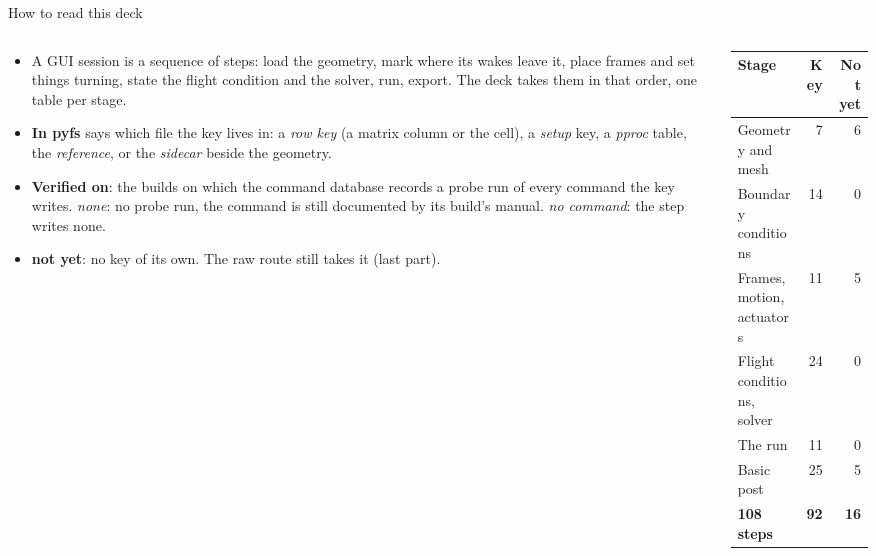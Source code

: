 %

\begin{frame}{How to read this deck}
\begin{columns}[T]
\begin{column}{0.56\textwidth}
\begin{itemize}\footnotesize
  \item A GUI session is a sequence of steps: load the geometry, mark where its
        wakes leave it, place frames and set things turning, state the flight
        condition and the solver, run, export. The deck takes them in that
        order, one table per stage.
  \item \textbf{In pyfs} says which file the key lives in: a \emph{row key}
        (a matrix column or the  cell), a
        \emph{setup} key, a \emph{pproc} table, the \emph{reference}, or the
        \emph{sidecar}  beside the geometry.
  \item \textbf{Verified on}: the builds on which the command database
        records a probe run of every command the key writes. \emph{none}: no
        probe run, the command is still documented by its build's manual.
        \emph{no command}: the step writes none.
  \item \textbf{not yet}: no key of its own. The raw route still takes it
        (last part).
\end{itemize}
\end{column}
\begin{column}{0.40\textwidth}
{\ftstablesize\setlength{\tabcolsep}{4pt}
\begin{tabular}{@{}lrr@{}}
\toprule
\textbf{Stage} & \textbf{Key} & \textbf{Not yet} \\
\midrule
Geometry and mesh & 7 & 6 \\
Boundary conditions & 14 & 0 \\
Frames, motion, actuators & 11 & 5 \\
Flight conditions, solver & 24 & 0 \\
The run & 11 & 0 \\
Basic post & 25 & 5 \\
\midrule
\textbf{108 steps} & \textbf{92} & \textbf{16} \\
\bottomrule
\end{tabular}}
\end{column}
\end{columns}
\end{frame}
